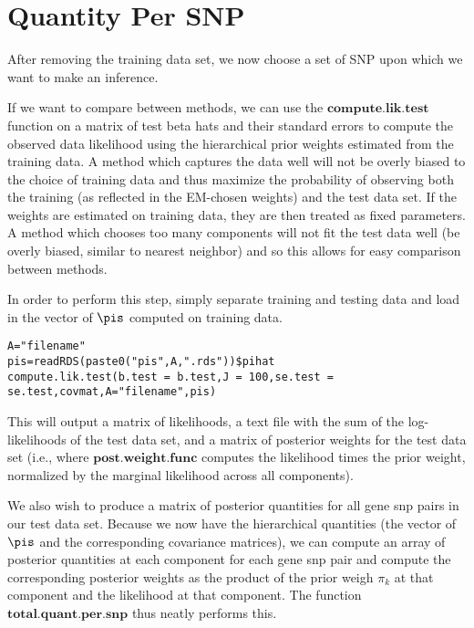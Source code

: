 \documentclass[10pt]{article}
\begin{document}

\section{Quantity Per SNP}

After removing the training data set, we now choose a set of SNP upon which we want to make an inference. 

If we want to compare between methods, we can use the $\textbf{compute.lik.test}$ function on a matrix of test beta hats and their standard errors to compute the observed data likelihood using the hierarchical prior weights estimated from the training data. A method which captures the data well will not be overly biased to the choice of training data and thus maximize the probability of observing both the training (as reflected in the EM-chosen weights) and the test data set. If the weights are estimated on training data, they are then treated as fixed parameters. A method which chooses too many components will not fit the test data well (be overly biased, similar to nearest neighbor) and so this allows for easy comparison between methods.

In order to perform this step, simply separate training and testing data and load in the vector of $\pis$ computed on training data.

\begin{verbatim}
A="filename"
pis=readRDS(paste0("pis",A,".rds"))$pihat
compute.lik.test(b.test = b.test,J = 100,se.test = se.test,covmat,A="filename",pis) 
\end{verbatim}

This will output a matrix of likelihoods, a text file with the sum of the log-likelihoods of the test data set, and a matrix of posterior weights for the test data set (i.e., where $\textbf{post.weight.func}$ computes the likelihood times the prior weight, normalized by the marginal likelihood across all components).

We also wish to produce a matrix of posterior quantities for all gene snp pairs in our test data set. Because we now have the hierarchical quantities (the vector of $\pis$ and the corresponding covariance matrices), we can compute an array of posterior quantities at each component for each gene snp pair and compute the corresponding posterior weights as the product of the prior weigh $\pi_{k}$ at that component and the likelihood at that component. The function $\textbf{total.quant.per.snp}$ thus neatly performs this.
\end{document}
